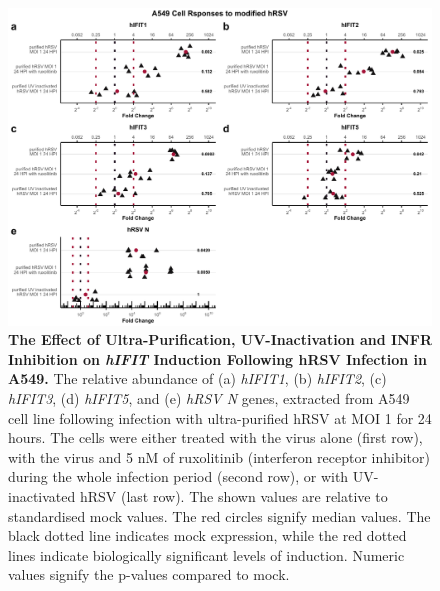 \begin{figure}
    \centering
    \includegraphics[width=1\linewidth]{06. Chapter 1/Figs/01. Induction/06. a549_hrsv_uv_roxo.pdf}
    \caption[The Effect of Ultra-Purification, UV-Inactivation and INFR Inhibition on \textit{hIFIT} Induction Following hRSV Infection in A549.]{\textbf{The Effect of Ultra-Purification, UV-Inactivation and INFR Inhibition on \textit{hIFIT} Induction Following hRSV Infection in A549.} The relative abundance of (a) \textit{hIFIT1}, (b) \textit{hIFIT2}, (c) \textit{hIFIT3}, (d) \textit{hIFIT5}, and (e) \textit{hRSV N} genes, extracted from A549 cell line following infection with ultra-purified hRSV at MOI 1 for 24 hours. The cells were either treated with the virus alone (first row), with the virus and 5 nM of ruxolitinib (interferon receptor inhibitor) during the whole infection period (second row), or with UV-inactivated hRSV (last row). The shown values are relative to standardised mock values. The red circles signify median values. The black dotted line indicates mock expression, while the red dotted lines indicate biologically significant levels of induction. Numeric values signify the p-values compared to mock.}
    \label{The effect of ultra-purification, UV-inactivation and INFR inhibition on hIFIT induction following hRSV infection in A549}
\end{figure}

